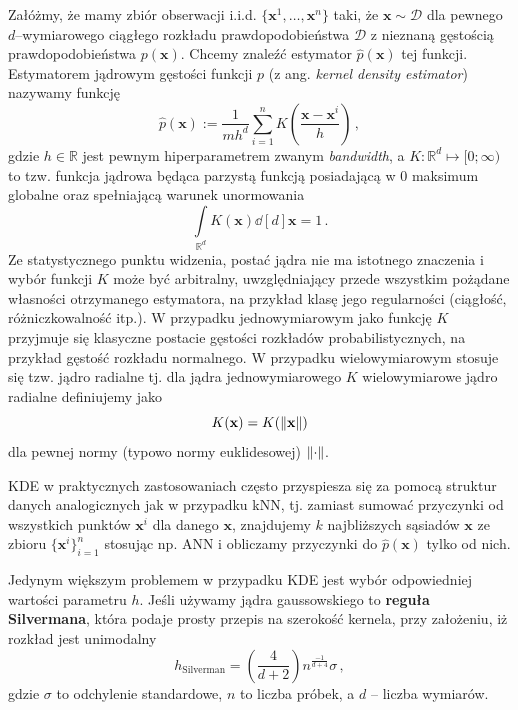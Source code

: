\documentclass{myclass}
\numberwithin{equation}{subsection}
\begin{document}
Załóżmy, że mamy zbiór obserwacji i.i.d. \(\{\mathbf{x}^1, \ldots, \mathbf{x}^n\}\) taki, że
\(\mathbf{x} \sim \mathcal{D}\) dla pewnego \(d\)--wymiarowego ciągłego rozkładu
prawdopodobieństwa \(\mathcal{D}\) z nieznaną gęstością prawdopodobieństwa \(p(\mathbf{x})\). Chcemy
znaleźć estymator \(\hat{p}(\mathbf{x})\) tej funkcji. Estymatorem jądrowym gęstości funkcji \(p\)
(z ang. \textit{kernel density estimator}) nazywamy funkcję
\begin{equation}\boxed{
    \hat{p}(\mathbf{x}) := \frac{1}{mh^d}\sum_{i=1}^n K\left(\frac{\mathbf{x} - \mathbf{x}^i}{h}\right)\,,
}\end{equation}
gdzie \(h \in \mathbb{R}\) jest pewnym hiperparametrem zwanym \textit{bandwidth}, a \(K:
\mathbb{R}^d \mapsto [0; \infty)\) to tzw. funkcja jądrowa będąca parzystą funkcją posiadającą w 0
maksimum globalne oraz spełniającą warunek unormowania
\begin{equation}
    \int\limits_{\mathbb{R}^d} K(\mathbf{x}) \dd[d]{\mathbf{x}}= 1\,.
\end{equation}
Ze statystycznego punktu widzenia, postać jądra nie ma istotnego znaczenia i wybór funkcji  \(K\)
może być arbitralny, uwzględniający przede wszystkim pożądane własności otrzymanego estymatora, na
przykład klasę jego regularności (ciągłość, różniczkowalność itp.). W przypadku jednowymiarowym jako
funkcję \(K\) przyjmuje się klasyczne postacie gęstości rozkładów probabilistycznych, na przykład
gęstość rozkładu normalnego. W przypadku wielowymiarowym stosuje się tzw. jądro radialne tj. dla
jądra jednowymiarowego \(K\) wielowymiarowe jądro radialne definiujemy jako
\begin{equation}
    K(\mathbf{x}) = K(\norm{\mathbf{x}})
\end{equation}
dla pewnej normy (typowo normy euklidesowej) \(\norm{\cdot}\).

KDE w praktycznych zastosowaniach często przyspiesza się za pomocą struktur danych analogicznych jak
w przypadku kNN, tj. zamiast sumować przyczynki od wszystkich punktów \(\mathbf{x}^i\) dla danego
\(\mathbf{x}\), znajdujemy \(k\) najbliższych sąsiadów \(\mathbf{x}\) ze zbioru
\(\{\mathbf{x}^i\}_{i=1}^n\) stosując np. ANN i obliczamy przyczynki do \(\hat{p}(\mathbf{x})\)
tylko od nich.

Jedynym większym problemem w przypadku KDE jest wybór odpowiedniej wartości parametru \(h\). Jeśli
używamy jądra gaussowskiego to \textbf{reguła Silvermana}, która podaje prosty przepis na szerokość
kernela, przy założeniu, iż rozkład jest unimodalny
\begin{equation}
    h_\mathrm{Silverman} = \left(\frac{4}{d + 2}\right)n^{\frac{-1}{d + 4}}\sigma\,,
\end{equation}
gdzie \(\sigma\) to odchylenie standardowe, \(n\) to liczba próbek, a \(d\) -- liczba wymiarów.
\end{document}
